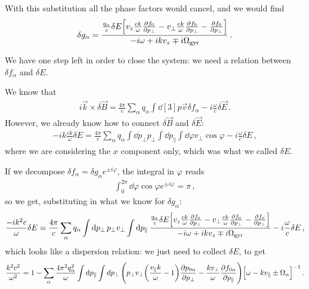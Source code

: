 \documentclass[main.tex]{subfiles}
\begin{document}
With this substitution all the phase factors would cancel, and we would find 
%
\begin{align}
\delta g_\alpha = \frac{\frac{q_\alpha}{c} \delta E \qty[v_z \frac{ck}{\omega } \pdv{f_0 }{p_\perp} - v_\perp \frac{ck}{\omega } \pdv{f_0 }{p_\perp} - \pdv{f_0 }{p_\perp}]}{- i \omega + i k v_z \mp i \Omega _{\text{gyr}}}
\,.
\end{align}

We have one step left in order to close the system: 
we need a relation between \(\delta f_\alpha \) and \(\delta E\). 

We know that 
%
\begin{align}
i \vec{k} \times \delta \vec{B} = \frac{4 \pi }{c} \sum _{\alpha } q_\alpha \int \dd[3]{p } \vec{v} \delta f_\alpha 
- i \frac{\omega}{c} \delta \vec{E}
\,.
\end{align}
%
However, we already know how to connect \(\delta \vec{B}\) and \(\delta \vec{E}\): 
%
\begin{align}
- i k \frac{ck}{\omega } \delta E = 
\frac{4 \pi }{c} \sum _{\alpha } q_\alpha \int \dd{p_\perp} p_\perp \int \dd{p_\parallel} \int \dd{\varphi } v_\perp \cos \varphi 
- i \frac{\omega}{c} \delta E
\,,
\end{align}
%
where we are considering the \(x\) component only, which was what we called \(\delta E\). 

If we decompose \(\delta f_\alpha  = \delta g_\alpha e^{\pm i \varphi }\), the integral in \(\varphi \) reads 
%
\begin{align}
\int_0^{2 \pi } \dd{\varphi } \cos \varphi e^{\pm i \varphi } = \pi 
\,,
\end{align}
%
so we get, substituting in what we know for \(\delta g_\alpha \): 
%
\begin{align}
\frac{- i k^2 c}{\omega } \delta E = \frac{4 \pi }{c} 
\sum _{\alpha } q_\alpha \int \dd{p_\perp} p_\perp v_\perp \int \dd{p_\parallel} 
\frac{\frac{q_\alpha}{c} \delta E \qty[v_z \frac{ck}{\omega } \pdv{f_0 }{p_\perp} - v_\perp \frac{ck}{\omega } \pdv{f_0 }{p_\perp} - \pdv{f_0 }{p_\perp}]}{- i \omega + i k v_z \mp i \Omega _{\text{gyr}}}
- i \frac{\omega}{c} \delta E
\,,
\end{align}
%
which looks like a dispersion relation: we just need to collect \(\delta E\), to get 
%
\begin{align}
\frac{k^2 c^2}{\omega^2} = 1 - \sum _{\alpha } \frac{4 \pi^2 q_\alpha^2}{\omega } \int \dd{p_\parallel} \int \dd{p_\perp} \qty( p_\perp v_\perp \qty(\frac{v_\parallel k}{\omega } - 1) \pdv{p_{0 \alpha }}{p_\perp} - \frac{k v_\perp}{\omega } \pdv{f_{0 \alpha }}{p_\parallel}) \qty[ \omega - k v_\parallel \pm \Omega _\alpha ]^{-1}
\,.
\end{align}
\end{document}

